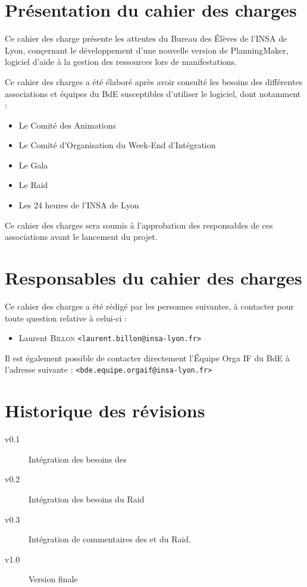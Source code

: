 \section{Présentation du cahier des charges}
Ce cahier des charge présente les attentes du Bureau des Élèves de l'INSA de Lyon, conçernant le développement d'une nouvelle version de PlanningMaker, logiciel
d'aide à la gestion des ressources lors de manifestations.

Ce cahier des charges a été élaboré après avoir consulté les besoins des différentes associations et équipes du BdE susceptibles d'utiliser le logiciel, dont notamment : 
\begin{itemize}
\item Le Comité des Animations
\item Le Comité d'Organisation du Week-End d'Intégration
\item Le Gala
\item Le Raid
\item Les 24 heures de l'INSA de Lyon
\end{itemize}

Ce cahier des charges sera soumis à l'approbation des responsables de ces associations avant le lancement du projet.

\section{Responsables du cahier des charges}
Ce cahier des charges a été rédigé par les personnes suivantes, à contacter pour toute question relative à celui-ci : 
\begin{itemize}
 \item Laurent \textsc{Billon} \texttt{<laurent.billon@insa-lyon.fr>}
\end{itemize}

Il est également possible de contacter directement l'Équipe Orga IF du BdE à l'adresse suivante : \texttt{<bde.equipe.orgaif@insa-lyon.fr>}

\section{Historique des révisions}

\begin{description}
\item[v0.1] Intégration des besoins des 
\item[v0.2] Intégration des besoins du Raid
\item[v0.3] Intégration de commentaires des  et du Raid.
\item[v1.0] Version finale
\end{description}